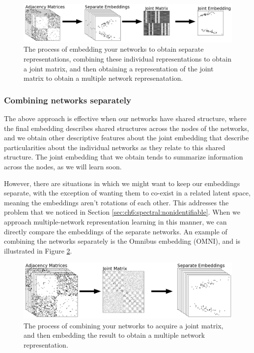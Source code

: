 \begin{figure}[h]
    \centering
    \includegraphics[width=\linewidth]{representations/ch6/Images/comb_emb.png}
    \caption[Combining embeddings together]{The process of embedding your networks to obtain separate representations, combining these individual representations to obtain a joint matrix, and then obtaining a representation of the joint matrix to obtain a multiple network represenatation.}
    \label{fig:ch6:multinet:comb_emb}
\end{figure}


\subsubsection{Combining networks separately}

The above approach is effective when our networks have shared structure, where the final embedding describes shared structures across the nodes of the networks, and we obtain other descriptive features about the joint embedding that describe particularities about the individual networks as they relate to this shared structure. The joint embedding that we obtain tends to summarize information across the nodes, as we will learn soon. 

However, there are situations in which we might want to keep our embeddings separate, with the exception of wanting them to co-exist in a related latent space, meaning the embeddings aren't rotations of each other. This addresses the problem that we noticed in Section \ref{sec:ch6:spectral:nonidentifiable}. When we approach multiple-network representation learning in this manner, we can directly compare the embeddings of the separate networks. An example of combining the networks separately is the Omnibus embedding (OMNI), and is illustrated in Figure \ref{fig:ch6:multinet:comb_sep}.

\begin{figure}[h]
    \centering
    \includegraphics[width=\linewidth]{representations/ch6/Images/comb_sep.png}
    \caption[Combining networks separately]{The process of combining your networks to acquire a joint matrix, and then embedding the result to obtain a multiple network representation.}
    \label{fig:ch6:multinet:comb_sep}
\end{figure}

